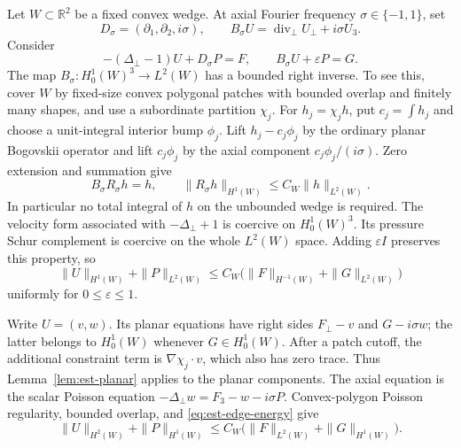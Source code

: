 \documentclass[11pt,a4paper]{article}
\theoremstyle{remark}
\numberwithin{equation}{section}
\begin{document}
Let $W\subset\mathbb R^2$ be a fixed convex wedge. At axial Fourier
frequency $\sigma\in\{-1,1\}$, set
\[
 D_\sigma=(\partial_1,\partial_2,i\sigma),\qquad
 B_\sigma U=\operatorname{div}_\perp U_\perp+i\sigma U_3.
\]
Consider
\begin{equation}\label{eq:est-edge-unit}
 - (\Delta_\perp-1)U+D_\sigma P=F,
 \qquad B_\sigma U+\varepsilon P=G.
\end{equation}
The map $B_\sigma:H_0^1(W)^3\to L^2(W)$ has a bounded right inverse.
To see this, cover $W$ by fixed-size convex polygonal patches with bounded
overlap and finitely many shapes, and use a subordinate partition
$\chi_j$. For $h_j=\chi_jh$, put $c_j=\int h_j$ and choose a unit-integral
interior bump $\phi_j$. Lift $h_j-c_j\phi_j$ by the ordinary planar
Bogovskii operator and lift $c_j\phi_j$ by the axial component
$c_j\phi_j/(i\sigma)$. Zero extension and summation give
\[
 B_\sigma R_\sigma h=h,
 \qquad \|R_\sigma h\|_{H^1(W)}\le C_W\|h\|_{L^2(W)}.
\]
In particular no total integral of $h$ on the unbounded wedge is required.
The velocity form associated with $-\Delta_\perp+1$ is coercive on
$H_0^1(W)^3$. Its pressure Schur complement is coercive on the whole
$L^2(W)$ space. Adding $\varepsilon I$ preserves this property, so
\begin{equation}\label{eq:est-edge-energy}
 \|U\|_{H^1(W)}+\|P\|_{L^2(W)}
 \le C_W\bigl(\|F\|_{H^{-1}(W)}+\|G\|_{L^2(W)}\bigr)
\end{equation}
uniformly for $0\le\varepsilon\le1$.

Write $U=(v,w)$. Its planar equations have right sides
$F_\perp-v$ and $G-i\sigma w$; the latter belongs to $H_0^1(W)$ whenever
$G\in H_0^1(W)$. After a patch cutoff, the additional constraint term is
$\nabla\chi_j\cdot v$, which also has zero trace. Thus
Lemma~\ref{lem:est-planar} applies to the planar components.
The axial equation is the scalar Poisson equation
$-\Delta_\perp w=F_3-w-i\sigma P$.
Convex-polygon Poisson regularity, bounded overlap, and
\eqref{eq:est-edge-energy} give
\begin{equation}\label{eq:est-edge-strong-unit}
 \|U\|_{H^2(W)}+\|P\|_{H^1(W)}
 \le C_W\bigl(\|F\|_{L^2(W)}+\|G\|_{H^1(W)}\bigr).
\end{equation}
\end{document}
